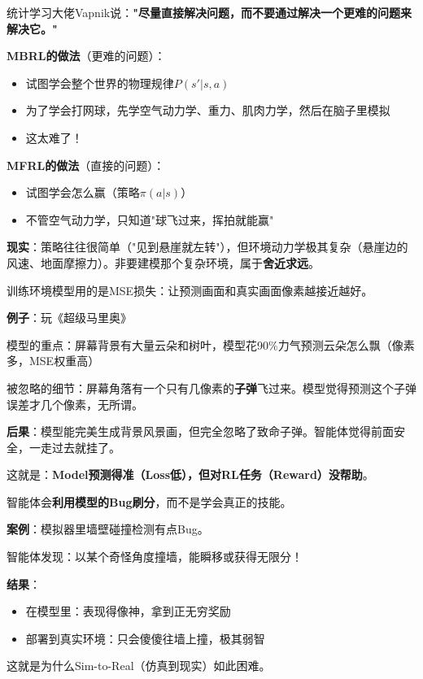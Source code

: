 \documentclass[11pt,a4paper]{article}
\theoremstyle{definition}
\begin{document}
\begin{keypoint}
统计学习大佬Vapnik说：\textbf{"尽量直接解决问题，而不要通过解决一个更难的问题来解决它。"}

\textbf{MBRL的做法}（更难的问题）：
\begin{itemize}
    \item 试图学会整个世界的物理规律$P(s'|s,a)$
    \item 为了学会打网球，先学空气动力学、重力、肌肉力学，然后在脑子里模拟
    \item 这太难了！
\end{itemize}

\textbf{MFRL的做法}（直接的问题）：
\begin{itemize}
    \item 试图学会怎么赢（策略$\pi(a|s)$）
    \item 不管空气动力学，只知道"球飞过来，挥拍就能赢"
\end{itemize}

\textbf{现实}：策略往往很简单（"见到悬崖就左转"），但环境动力学极其复杂（悬崖边的风速、地面摩擦力）。非要建模那个复杂环境，属于\textbf{舍近求远}。
\end{keypoint}

\begin{keypoint}
训练环境模型用的是MSE损失：让预测画面和真实画面像素越接近越好。

\textbf{例子}：玩《超级马里奥》

模型的重点：屏幕背景有大量云朵和树叶，模型花90\%力气预测云朵怎么飘（像素多，MSE权重高）

被忽略的细节：屏幕角落有一个只有几像素的\textbf{子弹}飞过来。模型觉得预测这个子弹误差才几个像素，无所谓。

\textbf{后果}：模型能完美生成背景风景画，但完全忽略了致命子弹。智能体觉得前面安全，一走过去就挂了。

这就是：\textbf{Model预测得准（Loss低），但对RL任务（Reward）没帮助}。
\end{keypoint}

\begin{keypoint}
智能体会\textbf{利用模型的Bug刷分}，而不是学会真正的技能。

\textbf{案例}：模拟器里墙壁碰撞检测有点Bug。

智能体发现：以某个奇怪角度撞墙，能瞬移或获得无限分！

\textbf{结果}：
\begin{itemize}
    \item 在模型里：表现得像神，拿到正无穷奖励
    \item 部署到真实环境：只会傻傻往墙上撞，极其弱智
\end{itemize}

这就是为什么Sim-to-Real（仿真到现实）如此困难。
\end{keypoint}
\end{document}
